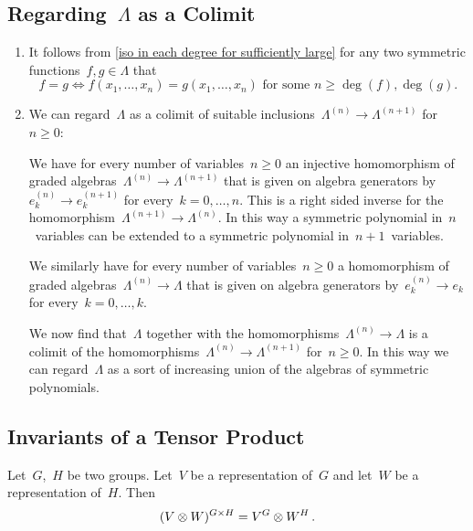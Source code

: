 \documentclass[a4paper, 11pt, twoside=semi]{scrartcl}
\begin{document}
\subsection{Regarding~$\Lambda$ as a Colimit}
\label{symmetric functions as colimit}

\begin{remark}
  \leavevmode
  \begin{enumerate}
    \item
      It follows from \cref{iso in each degree for sufficiently large} for any two symmetric functions~$f, g \in \Lambda$ that
      \[
        f = g
        \iff
        \text{$f(x_1, \dotsc, x_n) = g(x_1, \dotsc, x_n)$ for some~$n \geq \deg(f), \deg(g)$.}
      \]
    \item
      We can regard~$\Lambda$ as a colimit of suitable inclusions~$\Lambda^{(n)} \to \Lambda^{(n+1)}$ for~$n \geq 0$:

      We have for every number of variables~$n \geq 0$ an injective homomorphism of graded algebras~$\Lambda^{(n)} \to \Lambda^{(n+1)}$ that is given on algebra generators by~$e^{(n)}_k \to e^{(n+1)}_k$ for every~$k = 0, \dotsc, n$.
      This is a right sided inverse for the homomorphism~$\Lambda^{(n+1)} \to \Lambda^{(n)}$.
      In this way a symmetric polynomial in~$n$~variables can be extended to a symmetric polynomial in~$n+1$~variables.

      We similarly have for every number of variables~$n \geq 0$ a homomorphism of graded algebras~$\Lambda^{(n)} \to \Lambda$ that is given on algebra generators by~$e^{(n)}_k \to e_k$ for every~$k = 0, \dotsc, k$.

      We now find that~$\Lambda$ together with the homomorphisms~$\Lambda^{(n)} \to \Lambda$ is a colimit of the homomorphisms~$\Lambda^{(n)} \to \Lambda^{(n+1)}$ for~$n \geq 0$.
      In this way we can regard~$\Lambda$ as a sort of increasing union of the algebras of symmetric polynomials.
  \end{enumerate}
\end{remark}



\subsection{Invariants of a Tensor Product}

\begin{lemma}
  \label{invariants of tensor product}
  Let~$G$,~$H$ be two groups.
  Let~$V$ be a representation of~$G$ and let~$W$ be a representation of~$H$.
  Then
  \[
    (V \otimes W)^{G \times H}
    =
    V^G \otimes W^H \,.
  \]
\end{lemma}
\end{document}
